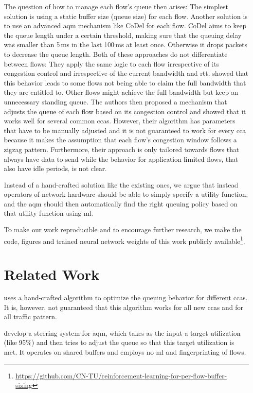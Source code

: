 \documentclass[conference]{IEEEtran}
\begin{document}
The question of how to manage each flow's queue then arises: The simplest solution is using a static buffer size (queue size) for each flow. Another solution is to use an advanced \gls{aqm} mechanism like CoDel for each flow. CoDel aims to keep the queue length under a certain threshold, making sure that the queuing delay was smaller than 5\,ms in the last 100\,ms at least once. Otherwise it drops packets to decrease the queue length. Both of these approaches do not differentiate between flows: They apply the same logic to each flow irrespective of its congestion control and irrespective of the current bandwidth and \gls{rtt}. \cite{bachl_cocoa_2019} showed that this behavior leads to some flows not being able to claim the full bandwidth that they are entitled to. Other flows might achieve the full bandwidth but keep an unnecessary standing queue. The authors then proposed a mechanism that adjusts the queue of each flow based on its congestion control and showed that it works well for several common \glspl{cca}. However, their algorithm has parameters that have to be manually adjusted and it is not guaranteed to work for every \gls{cca} because it makes the assumption that each flow's congestion window follows a zigzag pattern. Furthermore, their approach is only tailored towards flows that always have data to send while the behavior for application limited flows, that also have idle periods, is not clear. 

Instead of a hand-crafted solution like the existing ones, we argue that instead operators of network hardware should be able to simply specify a utility function, and the \gls{aqm} should then automatically find the right queuing policy based on that utility function using \gls{ml}. 

To make our work reproducible and to encourage further research, we make the code, figures and trained neural network weights of this work publicly available\footnote{\url{https://github.com/CN-TU/reinforcement-learning-for-per-flow-buffer-sizing}}. 

\section{Related Work}

\cite{bachl_cocoa_2019} uses a hand-crafted algorithm to optimize the queuing behavior for different \glspl{cca}. It is, however, not guaranteed that this algorithm works for all new \glspl{cca} and for all traffic pattern. 

\cite{bless_policy-oriented_2018} develop a steering system for \gls{aqm}, which takes as the input a target utilization (like 95\%) and then tries to adjust the queue so that this target utilization is met. It operates on shared buffers and employs no \gls{ml} and fingerprinting of flows. 
\end{document}
